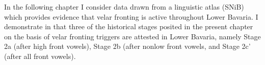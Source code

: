 In the following chapter I consider data drawn from a linguistic atlas (SNiB) which provides evidence that velar fronting is active throughout Lower Bavaria. I demonstrate in  that three of the historical stages posited in the present chapter on the basis of velar fronting triggers are attested in Lower Bavaria, namely Stage 2a (after high front vowels), Stage 2b (after nonlow front vowels, and Stage 2c' (after all front vowels).
